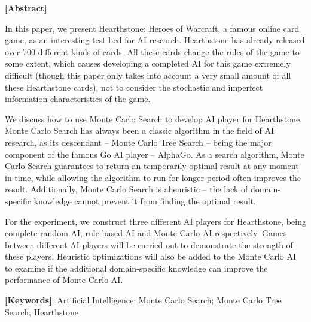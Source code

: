 \vspace{0.5cm}
{}
\centerline{\xiaoerhao \textbf{[Abstract]}}
\vspace{0.5cm}

In this paper, we present Hearthstone: Heroes of Warcraft, a famous online card game, as an interesting test bed for AI research. Hearthstone has already released over 700 different kinds of cards. All these cards change the rules of the game to some extent, which causes developing a completed AI for this game extremely difficult (though this paper only takes into account a very small amount of all these Hearthstone cards), not to consider the stochastic and imperfect information characteristics of the game.

We discuss how to use Monte Carlo Search to develop AI player for Hearthstone. Monte Carlo Search has always been a classic algorithm in the field of AI research, as its descendant -- Monte Carlo Tree Search -- being the major component of the famous Go AI player -- AlphaGo. As a search algorithm, Monte Carlo Search guarantees to return an temporarily-optimal result at any moment in time, while allowing the algorithm to run for longer period often improves the result. Additionally, Monte Carlo Search is aheuristic -- the lack of domain-specific knowledge cannot prevent it from finding the optimal result.

For the experiment, we construct three different AI players for Hearthstone, being complete-random AI, rule-based AI and Monte Carlo AI respectively. Games between different AI players will be carried out to demonstrate the strength of these players. Heuristic optimizations will also be added to the Monte Carlo AI to examine if the additional domain-specific knowledge can improve the performance of Monte Carlo AI.

\par\setlength\parindent{0em}\textbf{[Keywords]}: Artificial Intelligence; Monte Carlo Search; Monte Carlo Tree Search; Hearthstone
\par\setlength\parindent{2em}
